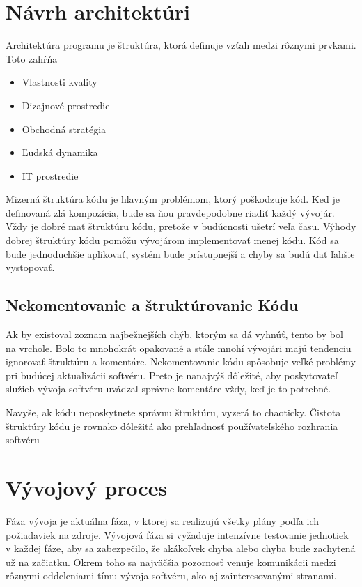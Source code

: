 \documentclass[10pt,twoside,slovak,a4paper]{article}
\begin{document}
\section{Návrh architektúri}
Architektúra programu je štruktúra, ktorá definuje vzťah medzi rôznymi prvkami. Toto zahŕňa

\begin{itemize}
\item Vlastnosti kvality
\item Dizajnové prostredie
\item Obchodná stratégia
\item Ľudská dynamika
\item IT prostredie
\end{itemize}






Mizerná štruktúra kódu je hlavným problémom, ktorý poškodzuje kód. Keď je definovaná zlá kompozícia, bude sa ňou pravdepodobne riadiť každý vývojár. Vždy je dobré mať štruktúru kódu, pretože v budúcnosti ušetrí veľa času. Výhody dobrej štruktúry kódu pomôžu vývojárom implementovať menej kódu. Kód sa bude jednoduchšie aplikovať, systém bude prístupnejší a chyby sa budú dať ľahšie vystopovať.

\subsection{Nekomentovanie a štruktúrovanie Kódu}

Ak by existoval zoznam najbežnejších chýb, ktorým sa dá vyhnúť, tento by bol na vrchole. Bolo to mnohokrát opakované a stále mnohí vývojári majú tendenciu ignorovať štruktúru a komentáre. Nekomentovanie kódu spôsobuje veľké problémy pri budúcej aktualizácii softvéru. Preto je nanajvýš dôležité, aby poskytovateľ služieb vývoja softvéru uvádzal správne komentáre vždy, keď je to potrebné.

Navyše, ak kódu neposkytnete správnu štruktúru, vyzerá to chaoticky. Čistota štruktúry kódu je rovnako dôležitá ako prehľadnosť používateľského rozhrania softvéru












\section{Vývojový proces}
Fáza vývoja je aktuálna fáza, v ktorej sa realizujú všetky plány podľa ich požiadaviek na zdroje. Vývojová fáza si vyžaduje intenzívne testovanie jednotiek v každej fáze, aby sa zabezpečilo, že akákoľvek chyba alebo chyba bude zachytená už na začiatku. Okrem toho sa najväčšia pozornosť venuje komunikácii medzi rôznymi oddeleniami tímu vývoja softvéru, ako aj zainteresovanými stranami.
\end{document}
